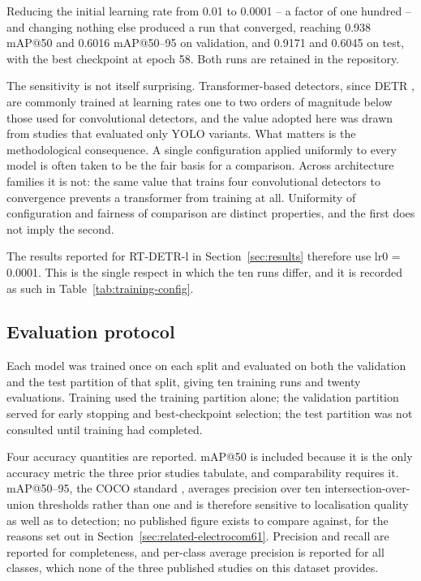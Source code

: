 Reducing the initial learning rate from 0.01 to 0.0001 -- a factor of one hundred
-- and changing nothing else produced a run that converged, reaching 0.938 mAP@50
and 0.6016 mAP@50--95 on validation, and 0.9171 and 0.6045 on test, with the best
checkpoint at epoch 58. Both runs are retained in the repository.

The sensitivity is not itself surprising. Transformer-based detectors, since
DETR \citep{detr}, are commonly trained at learning rates one to two orders of
magnitude below those used for convolutional detectors, and the value adopted
here was drawn from studies that evaluated only YOLO variants. What matters is the methodological consequence. A
single configuration applied uniformly to every model is often taken to be the
fair basis for a comparison. Across architecture families it is not: the same
value that trains four convolutional detectors to convergence prevents a
transformer from training at all. Uniformity of configuration and fairness of
comparison are distinct properties, and the first does not imply the second.

The results reported for RT-DETR-l in Section~\ref{sec:results} therefore use
lr0 = 0.0001. This is the single respect in which the ten runs differ, and it is
recorded as such in Table~\ref{tab:training-config}.

\subsection{Evaluation protocol}
\label{sec:eval-protocol}

Each model was trained once on each split and evaluated on both the validation
and the test partition of that split, giving ten training runs and twenty
evaluations. Training used the training partition alone; the validation
partition served for early stopping and best-checkpoint selection; the test
partition was not consulted until training had completed.

Four accuracy quantities are reported. mAP@50 is included because it is the only
accuracy metric the three prior studies tabulate, and comparability requires
it. mAP@50--95, the COCO standard \citep{coco}, averages precision over ten
intersection-over-union thresholds rather than one and is therefore sensitive to
localisation quality as well as to detection; no published figure exists to
compare against, for the reasons set out in
Section~\ref{sec:related-electrocom61}. Precision and recall are reported for
completeness, and per-class average precision is reported for all classes,
which none of the three published studies on this dataset provides.

